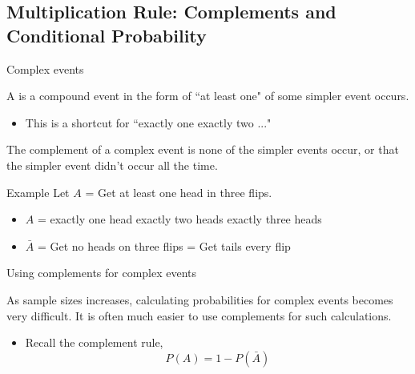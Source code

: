 \documentclass[xcolor=table]{beamer}
\begin{document}
\subsection{Multiplication Rule: Complements and Conditional Probability}

\begin{frame}{Complex events}

\begin{block}{}
{\large A  is a compound event in the form of ``at least one" of some simpler event occurs.}
\begin{itemize}
\pause
\item This is a shortcut for ``exactly one  exactly two ..."
\end{itemize}
\end{block}

\pause

\begin{block}{}
The complement of a complex event is none of the simpler events occur, or that the simpler event didn't occur all the time.
\end{block}

\begin{exampleblock}{Example}
Let $A$ = Get at least one head in three flips.
\begin{itemize}
\pause
\item $A$ = exactly one head  exactly two heads  exactly three heads
\pause
\item $\bar A$ = Get no heads on three flips = Get tails every flip
\end{itemize}
\end{exampleblock}
\end{frame}

\begin{frame}{Using complements for complex events}
\begin{block}{}
As sample sizes increases, calculating probabilities for complex events becomes very difficult. It is often much easier to use complements for such calculations.

\begin{itemize}
\item Recall the complement rule,
\[P(A) = 1 - P(\bar A)\]
\end{itemize}
\end{block}
\end{frame}
\end{document}
